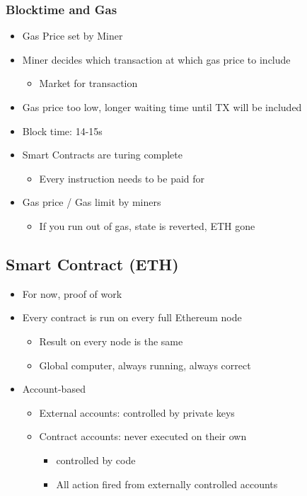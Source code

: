 \subsubsection{Blocktime and Gas}
\begin{itemize}
    \item Gas Price set by Miner
    \item Miner decides which transaction at which gas price to include
    \begin{itemize}
        \item Market for transaction
    \end{itemize}
    \item Gas price too low, longer waiting time until TX will be included
    \item Block time: 14-15s
    \item Smart Contracts are turing complete
    \begin{itemize}
        \item Every instruction needs to be paid for
    \end{itemize}
    \item Gas price / Gas limit by miners
    \begin{itemize}
        \item If you run out of gas, state is reverted, ETH gone
    \end{itemize}
\end{itemize}

\subsection{Smart Contract (ETH)}
\begin{itemize}
    \item For now, proof of work
    \item Every contract is run on every full Ethereum node
    \begin{itemize}
        \item Result on every node is the same
        \item Global computer, always running, always correct
    \end{itemize}
    \item Account-based
    \begin{itemize}
        \item External accounts: controlled by private keys
        \item Contract accounts: never executed on their own
        \begin{itemize}
            \item controlled by code
            \item All action fired from externally controlled accounts
        \end{itemize}
    \end{itemize}
\end{itemize}

